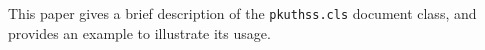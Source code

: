 \begin{eabstract}

This paper gives a brief description of the \verb|pkuthss.cls|
document class, and provides an example to illustrate its usage.

\end{eabstract}
